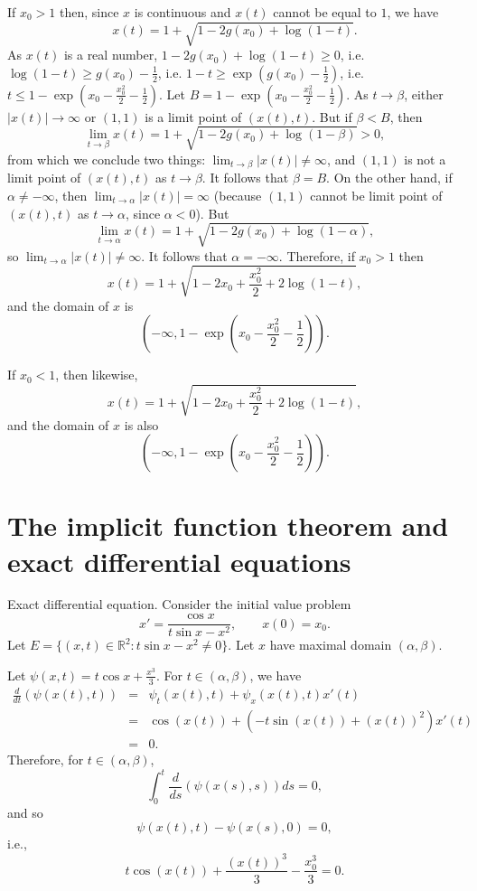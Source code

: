 \documentclass{article}
\begin{document}
If $x_0>1$ then, since $x$ is continuous and $x(t)$ cannot be equal to $1$, we have
\[
x(t)=1+\sqrt{1-2g(x_0)+\log(1-t)}.
\]
As $x(t)$ is a real number,  $1-2g(x_0)+\log(1-t) \geq 0$, i.e. $\log(1-t) \geq g(x_0)-\frac{1}{2}$, i.e.
$1-t \geq \exp(g(x_0)-\frac{1}{2})$, i.e. $t \leq 1-\exp\left(x_0 - \frac{x_0^2}{2}-\frac{1}{2}\right)$. Let $B=1-\exp\left(x_0 - \frac{x_0^2}{2}-\frac{1}{2}\right)$. 
As $t \to \beta$, either $|x(t)| \to \infty$ or $(1,1)$ is a limit point of $(x(t),t)$. But if $\beta < B$, then
\[
\lim_{t \to \beta} x(t)=1+\sqrt{1-2g(x_0)+\log(1-\beta)}>0,
\]
from which we conclude two things:
$\lim_{t \to \beta} |x(t)| \neq \infty$, and $(1,1)$ is not a limit point of $(x(t),t)$ as $t \to \beta$. It follows that $\beta=B$. On the other hand, 
if $\alpha \neq -\infty$, then $\lim_{t \to \alpha} |x(t)|=\infty$ (because $(1,1)$ cannot be limit point of $(x(t),t)$ as $t \to \alpha$, since $\alpha<0$). 
But 
\[
\lim_{t \to \alpha} x(t)=1+\sqrt{1-2g(x_0)+\log(1-\alpha)},
\]
so $\lim_{t \to \alpha} |x(t)| \neq \infty$. It follows that $\alpha=-\infty$. Therefore, if $x_0>1$ then
\[
x(t)=1+\sqrt{1-2x_0+\frac{x_0^2}{2}+2\log(1-t)},
\]
and the domain of $x$ is
\[
\left( -\infty, 1-\exp\left(x_0 - \frac{x_0^2}{2}-\frac{1}{2}\right) \right).
\]

If $x_0<1$, then likewise,
\[
x(t)=1+\sqrt{1-2x_0+\frac{x_0^2}{2}+2\log(1-t)},
\]
and the domain of $x$ is also
\[
\left( -\infty, 1-\exp\left(x_0 - \frac{x_0^2}{2}-\frac{1}{2}\right) \right).
\]

\section{The implicit function theorem and exact differential equations}
Exact differential equation. Consider the initial value problem
\[
x'=\frac{\cos x}{t\sin x-x^2}, \qquad x(0)=x_0.
\]
Let $E=\{(x,t) \in \mathbb{R}^2: t\sin x-x^2 \neq 0\}$.  Let $x$ have maximal domain $(\alpha,\beta)$.

Let $\psi(x,t)=t\cos x+\frac{x^3}{3}$. For $t \in (\alpha,\beta)$, we have
\begin{eqnarray*}
\frac{d}{dt} (\psi(x(t),t))&=&\psi_t(x(t),t)+\psi_x(x(t),t)x'(t)\\
&=&\cos(x(t))+(-t\sin(x(t))+(x(t))^2)x'(t)\\
&=&0.
\end{eqnarray*}
Therefore, for $t \in (\alpha,\beta)$,
\[
\int_0^t \frac{d}{ds} (\psi(x(s),s))  ds=0,
\]
and so
\[
\psi(x(t),t)-\psi(x(s),0)=0,
\]
i.e.,
\begin{equation}
t\cos(x(t))+\frac{(x(t))^3}{3}-\frac{x_0^3}{3}=0.
\label{curve}
\end{equation}
\end{document}
